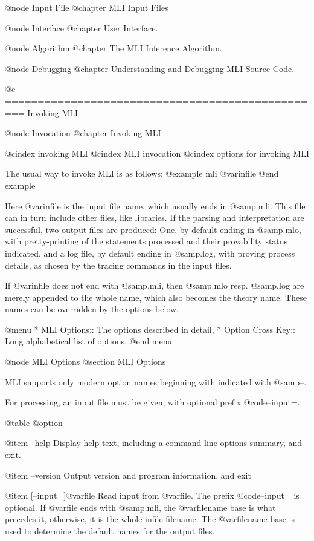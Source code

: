 @node Input File
@chapter MLI Input Files


@node Interface
@chapter User Interface.


@node Algorithm
@chapter The MLI Inference Algorithm.


@node Debugging
@chapter Understanding and Debugging MLI Source Code.


@c ================================================= Invoking MLI

@node Invocation
@chapter Invoking MLI

@cindex invoking MLI
@cindex MLI invocation
@cindex options for invoking MLI

The usual way to invoke MLI is as follows:
@example
mli @var{infile}
@end example

Here @var{infile} is the input file name, which usually ends in
@samp{.mli}. This file can in turn include other files, like libraries.
If the parsing and interpretation are successful, two output files
are produced: One, by default ending in @samp{.mlo}, with pretty-printing of the
statements processed and their provability status indicated, and a log file,
by default ending in @samp{.log}, with proving process details, as
chosen by the tracing commands in the input files.

If @var{infile} does not end with @samp{.mli}, then @samp{.mlo} resp. @samp{.log}
are merely appended to the whole name, which also becomes the theory name. These
names can be overridden by the options below.

@menu
* MLI Options::     The options described in detail,
* Option Cross Key::  Long alphabetical list of options.
@end menu


@node MLI Options
@section MLI Options

MLI supports only modern option names beginning with indicated with @samp{--}.

For processing, an input file must be given, with optional prefix @code{--input=}.

@table @option

@item --help
Display help text, including a command line options summary, and exit.

@item --version
Output version and program information, and exit


@item [--input=]@var{file}
Read input from @var{file}. The prefix @code{--input=} is optional.
If @var{file} ends with @samp{.mli}, the @var{filename
base} is what precedes it, otherwise, it is the whole infile filename.
The @var{filename base} is used to determine the default names for the output files.

